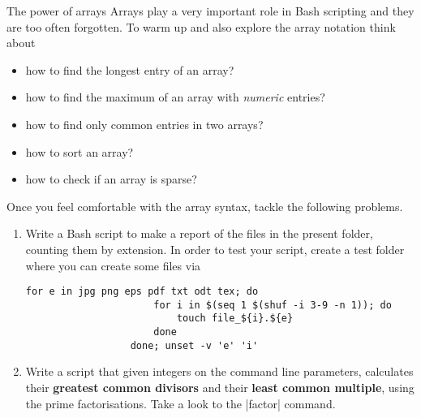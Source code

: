
\begin{exercise}[Instructive]{The power of arrays}
    Arrays play a very important role in Bash scripting and they are too often forgotten.
    To warm up and also explore the array notation think about
    \begin{itemize}
        \item how to find the longest entry of an array?
        \item how to find the maximum of an array with \emph{numeric} entries?
        \item how to find only common entries in two arrays?
        \item how to sort an array?
        \item how to check if an array is sparse?
    \end{itemize}
    Once you feel comfortable with the array syntax, tackle the following problems.
    \begin{enumerate}[after=\vspace{-\baselineskip}]
        \item Write a Bash script to make a report of the files in the present folder, counting them by extension.
              In order to test your script, create a test folder where you can create some files via
              \begin{lstlisting}[style=MyBash]
                  for e in jpg png eps pdf txt odt tex; do
                      for i in $(seq 1 $(shuf -i 3-9 -n 1)); do
                          touch file_${i}.${e}
                      done
                  done; unset -v 'e' 'i'
              \end{lstlisting}
        \item Write a script that given integers on the command line parameters, calculates their \textbf{greatest common divisors} and their \textbf{least common multiple}, using the prime factorisations.
              Take a look to the \bash|factor| command.
    \end{enumerate}
    \bigskip
\end{exercise}
